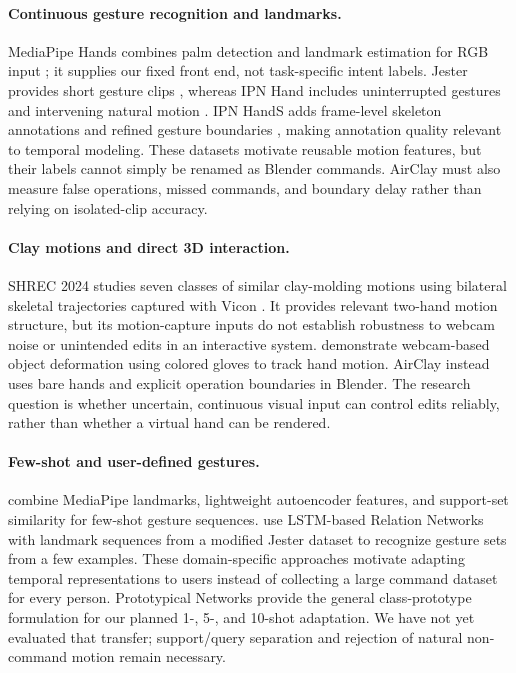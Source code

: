 \documentclass{article}
\begin{document}
\paragraph{Continuous gesture recognition and landmarks.}
MediaPipe Hands combines palm detection and landmark estimation for RGB input
\citep{zhang2020}; it supplies our fixed front end, not task-specific intent labels.
Jester provides short gesture clips \citep{materzynska2019jester}, whereas IPN Hand
includes uninterrupted gestures and intervening natural motion \citep{benitez2021}.
IPN HandS adds frame-level skeleton annotations and refined gesture boundaries
\citep{benitez2025ipnhands}, making annotation quality relevant to temporal modeling.
These datasets motivate reusable motion features, but their labels cannot simply
be renamed as Blender commands. AirClay must also measure false operations, missed
commands, and boundary delay rather than relying on isolated-clip accuracy.

\paragraph{Clay motions and direct 3D interaction.}
SHREC 2024 studies seven classes of similar clay-molding motions using bilateral
skeletal trajectories captured with Vicon \citep{veldhuijzen2024shrec}. It provides
relevant two-hand motion structure, but its motion-capture inputs do not establish
robustness to webcam noise or unintended edits in an interactive system.
\citet{mahdikhanlou2022deforming} demonstrate webcam-based object deformation using
colored gloves to track hand motion. AirClay instead uses bare hands and explicit
operation boundaries in Blender. The research question is whether uncertain,
continuous visual input can control edits reliably, rather than whether a virtual
hand can be rendered.

\paragraph{Few-shot and user-defined gestures.}
\citet{liu2022continuous} combine MediaPipe landmarks, lightweight autoencoder
features, and support-set similarity for few-shot gesture sequences.
\citet{schluesener2022fast} use LSTM-based Relation Networks with landmark sequences
from a modified Jester dataset to recognize gesture sets from a few examples.
These domain-specific approaches motivate adapting temporal representations to
users instead of collecting a large command dataset for every person. Prototypical
Networks \citep{snell2017} provide the general class-prototype formulation for our
planned 1-, 5-, and 10-shot adaptation. We have not yet evaluated that transfer;
support/query separation and rejection of natural non-command motion remain necessary.
\end{document}

